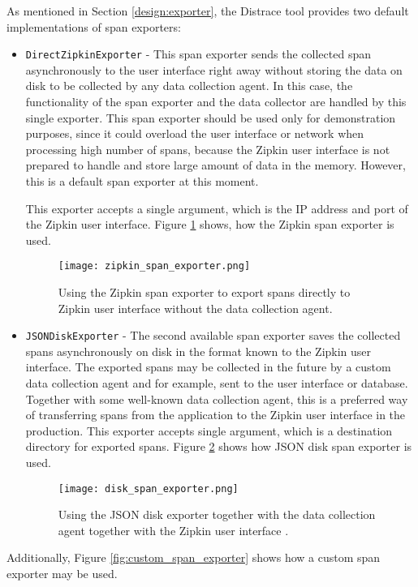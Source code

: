 As mentioned in Section \ref{design:exporter}, the Distrace tool provides two default implementations of span exporters:
\begin{itemize}
	\item  \texttt{DirectZipkinExporter} -  This span exporter sends the collected span asynchronously to the user interface right away without storing the data on disk to be collected by any data collection agent. In this case, the functionality of the span exporter and the data collector are handled by this single exporter.
	This span exporter should be used only for demonstration purposes, since it could overload the user interface or network when processing high number of spans, because the Zipkin user interface is not prepared to handle and store large amount of data in the memory. However, this is a default span exporter at this moment.
	
	This exporter accepts a single argument, which is the IP address and port of the Zipkin user interface. Figure \ref{fig:zipkin_span_exporter} shows, how the Zipkin span exporter is used.
	
	\begin{figure}
		\centering
		\texttt{[image: zipkin\_span\_exporter.png]}
		\caption{Using the Zipkin span exporter to export spans directly to Zipkin user interface without the data collection agent.}
		\label{fig:zipkin_span_exporter}
	\end{figure}
	\item  \texttt{JSONDiskExporter} - The second available span exporter saves the collected spans asynchronously on disk in the format known to the Zipkin user interface. The exported spans may be collected in the future by a custom data collection agent and for example, sent to the user interface or database. Together with some well-known data collection agent, this is a preferred way of transferring spans from the application to the Zipkin user interface in the production. This exporter accepts single argument, which is a destination directory for exported spans. Figure \ref{fig:disk_span_exporter} shows how JSON disk span exporter is used.
	\begin{figure}
		\centering
		\texttt{[image: disk\_span\_exporter.png]}
		\caption{Using the JSON disk exporter together with the data collection agent together with the Zipkin user interface .}
		\label{fig:disk_span_exporter}
	\end{figure}
\end{itemize}
Additionally, Figure \ref{fig:custom_span_exporter} shows how a custom span exporter may be used.


